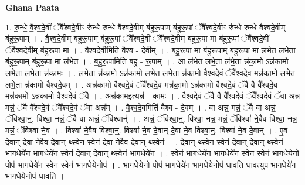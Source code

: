 \documentclass[17pt]{extarticle}
\begin{document}
\textbf{Ghana Paata } \newline

1. रु॒न्धे॒ वै॒श्व॒दे॒वीं ॅवै᳚श्वदे॒वीꣳ रु॑न्धे रुन्धे वैश्वदे॒वीम् ब॑हुरू॒पाम् ब॑हुरू॒पां ॅवै᳚श्वदे॒वीꣳ रु॑न्धे रुन्धे वैश्वदे॒वीम् ब॑हुरू॒पाम् । . वै॒श्व॒दे॒वीम् ब॑हुरू॒पाम् ब॑हुरू॒पां ॅवै᳚श्वदे॒वीं ॅवै᳚श्वदे॒वीम् ब॑हुरू॒पा मा ब॑हुरू॒पां ॅवै᳚श्वदे॒वीं ॅवै᳚श्वदे॒वीम् ब॑हुरू॒पा मा । . वै॒श्व॒दे॒वीमिति॑ वैश्व - दे॒वीम् । . ब॒हु॒रू॒पा मा ब॑हुरू॒पाम् ब॑हुरू॒पा मा ल॑भेत लभे॒ता ब॑हुरू॒पाम् ब॑हुरू॒पा मा ल॑भेत । . ब॒हु॒रू॒पामिति॑ बहु - रू॒पाम् । . आ ल॑भेत लभे॒ता ल॑भे॒ता न्न॑का॒मो ऽन्न॑कामो लभे॒ता ल॑भे॒ता न्न॑कामः । . ल॒भे॒ता न्न॑का॒मो ऽन्न॑कामो लभेत लभे॒ता न्न॑कामो वैश्वदे॒वं ॅवै᳚श्वदे॒व मन्न॑कामो लभेत लभे॒ता न्न॑कामो वैश्वदे॒वम् । . अन्न॑कामो वैश्वदे॒वं ॅवै᳚श्वदे॒व मन्न॑का॒मो ऽन्न॑कामो वैश्वदे॒वं ॅवै वै वै᳚श्वदे॒व मन्न॑का॒मो ऽन्न॑कामो वैश्वदे॒वं ॅवै । . अन्न॑काम॒इत्यन्न॑ - का॒मः॒ । . वै॒श्व॒दे॒वं ॅवै वै वै᳚श्वदे॒वं ॅवै᳚श्वदे॒वं ॅवा अन्न॒ मन्नं॒ ॅवै वै᳚श्वदे॒वं ॅवै᳚श्वदे॒वं ॅवा अन्न᳚म् । . वै॒श्व॒दे॒वमिति॑ वैश्व - दे॒वम् । . वा अन्न॒ मन्नं॒ ॅवै वा अन्नं॒ ॅविश्वा॒न्॒. विश्वा॒ नन्नं॒ ॅवै वा अन्नं॒ ॅविश्वान्॑ । . अन्नं॒ ॅविश्वा॒न्॒. विश्वा॒ नन्न॒ मन्नं॒ ॅविश्वा॑ ने॒वैव विश्वा॒ नन्न॒ मन्नं॒ ॅविश्वा॑ ने॒व । . विश्वा॑ ने॒वैव विश्वा॒न्॒. विश्वा॑ ने॒व दे॒वान् दे॒वा ने॒व विश्वा॒न्॒. विश्वा॑ ने॒व दे॒वान् । . ए॒व दे॒वान् दे॒वा ने॒वैव दे॒वान् थ्स्वेन॒ स्वेन॑ दे॒वा ने॒वैव दे॒वान् थ्स्वेन॑ । . दे॒वान् थ्स्वेन॒ स्वेन॑ दे॒वान् दे॒वान् थ्स्वेन॑ भाग॒धेये॑न भाग॒धेये॑न॒ स्वेन॑ दे॒वान् दे॒वान् थ्स्वेन॑ भाग॒धेये॑न । . स्वेन॑ भाग॒धेये॑न भाग॒धेये॑न॒ स्वेन॒ स्वेन॑ भाग॒धेये॒नो पोप॑ भाग॒धेये॑न॒ स्वेन॒ स्वेन॑ भाग॒धेये॒नोप॑ । . भा॒ग॒धेये॒नो पोप॑ भाग॒धेये॑न भाग॒धेये॒नोप॑ धावति धाव॒त्युप॑ भाग॒धेये॑न भाग॒धेये॒नोप॑ धावति । \newline
\end{document}
